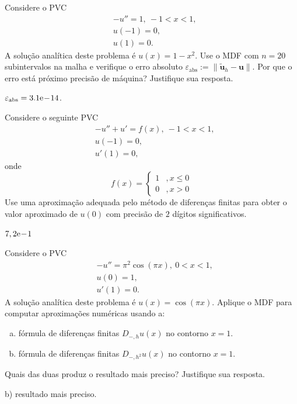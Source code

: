 \begin{exer}
  Considere o PVC
  \begin{align}
    &-u'' = 1, ~-1 < x < 1,\\
    &u(-1) = 0,\\
    &u(1) = 0.
  \end{align}
  A solução analítica deste problema é $u(x) = 1-x^2$. Use o MDF com $n=20$ subintervalos na malha e verifique o erro absoluto $\varepsilon_{\text{abs}} := \|\tilde{\pmb{u}}_h - \pmb{u}\|$. Por que o erro está próximo precisão de máquina? Justifique sua resposta.
\end{exer}
\begin{resp}
  $\varepsilon_{\text{abs}} = 3.1\mathrm{e}\!-\!14$.
\end{resp}

\begin{exer}
Considere o seguinte PVC
\begin{subequations}
  \begin{align}
    &-u'' + u' = f(x), ~-1 < x < 1,\\
    &u(-1) = 0,\\
    &u'(1) =0,
  \end{align}
\end{subequations}
onde
\begin{equation}
  f(x) = \left\{
    \begin{array}{ll}
      1 &, x\leq 0\\
      0 &, x>0
    \end{array}
  \right.
\end{equation}
Use uma aproximação adequada pelo método de diferenças finitas para obter o valor aproximado de $u(0)$ com precisão de $2$ dígitos significativos.
\end{exer}
\begin{resp}
  $7,2\mathrm{e}\!-\!1$
\end{resp}

\begin{exer}
  Considere o PVC
  \begin{align}
    &-u'' = \pi^2\cos(\pi x), ~0 < x < 1,\\
    &u(0) = 1,\\
    &u'(1) = 0.
  \end{align}
  A solução analítica deste problema é $u(x) = \cos(\pi x)$. Aplique o MDF para computar aproximações numéricas usando a:
  \begin{enumerate}[a)]
  \item fórmula de diferenças finitas $D_{-,h}u(x)$ no contorno $x=1$.
  \item fórmula de diferenças finitas $D_{-,h^2}u(x)$ no contorno $x=1$.
  \end{enumerate}
  Quais das duas produz o resultado mais preciso? Justifique sua resposta.
\end{exer}
\begin{resp}
  b) resultado mais preciso.
\end{resp}

